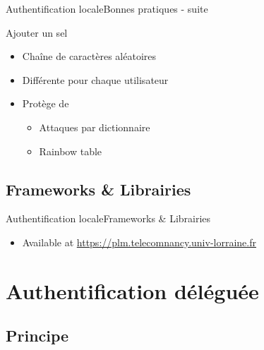 \documentclass{beamer}
\begin{document}
\begin{frame}{Authentification locale}{Bonnes pratiques - suite}
  \begin{center}
    \begin{block}{Ajouter un sel}
      \begin{itemize}
        \item Chaîne de caractères aléatoires
        \item Différente pour chaque utilisateur
        \item Protège de
          \begin{itemize}
            \item Attaques par dictionnaire
            \item Rainbow table
          \end{itemize}
      \end{itemize}
    \end{block}
  \end{center}
\end{frame}

\subsection{Frameworks \& Librairies}

\begin{frame}{Authentification locale}{Frameworks \& Librairies}
  \begin{center}
    \begin{itemize}
    \item Available at \url{https://plm.telecomnancy.univ-lorraine.fr}
    \end{itemize}
  \end{center}
\end{frame}

\section{Authentification déléguée}

\subsection{Principe}
\end{document}
